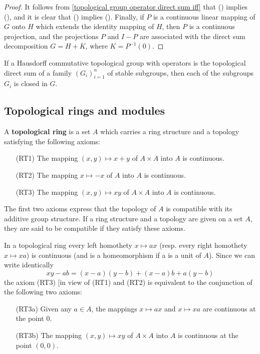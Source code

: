 \begin{proof}
It follows from \cref{topological group operator direct sum iff} that () implies (), and it is clear that () implies (). Finally, if $P$ is a continuous linear mapping of $G$ onto $H$ which extends the identity mapping of $H$, then $P$ is a continuous projection, and the projections $P$ and $I-P$ are associated with the direct sum decomposition $G=H+K$, where $K=P^{-1}(0)$.
\end{proof}
\begin{corollary}
If a Hausdorff commutative topological group with operators is the topological direct sum of a family $(G_i)_{i=1}^{n}$ of stable subgroups, then each of the subgroups $G_i$ is closed in $G$.
\end{corollary}
\subsection{Topological rings and modules}
\begin{definition}
A \textbf{topological ring} is a set $A$ which carries a ring structure and a topology satisfying the following axioms:
\begin{enumerate}[leftmargin=40pt]
\item[(RT1)] The mapping $(x,y)\mapsto x+y$ of $A\times A$ into $A$ is continuous.
\item[(RT2)] The mapping $x\mapsto-x$ of $A$ into $A$ is continuous.
\item[(RT3)] The mapping $(x,y)\mapsto xy$ of $A\times A$ into $A$ is continuous.
\end{enumerate}
\end{definition}
The first two axioms express that the topology of $A$ is compatible with its additive group structure. If a ring structure and a topology are given on a set $A$, they are said to be compatible if they satisfy these axioms.\par
In a topological ring every left homothety $x\mapsto ax$ (resp. every right homothety $x\mapsto xa$) is continuous (and is a homeomorphism if a is a unit of $A$). Since we can write identically
\[xy-ab=(x-a)(y-b)+(x-a)b+a(y-b)\]
the axiom (RT3) [in view of (RT1) and (RT2) is equivalent to the conjunction of the following two axioms:
\begin{enumerate}[leftmargin=45pt]
\item[(RT3a)] Given any $a\in A$, the mappings $x\mapsto ax$ and $x\mapsto xa$ are continuous at the point $0$.
\item[(RT3b)] The mapping $(x,y)\mapsto xy$ of $A\times A$ into $A$ is continuous at the point $(0,0)$.
\end{enumerate}
